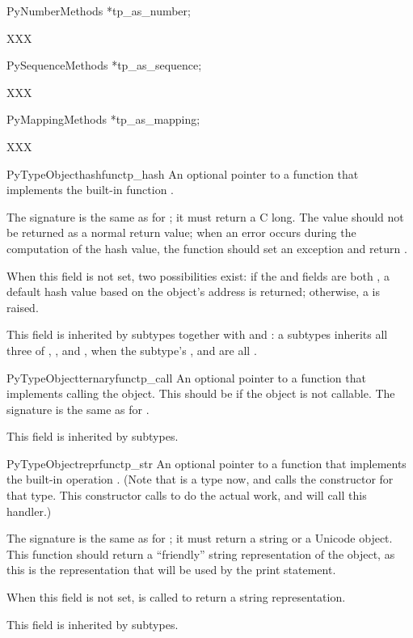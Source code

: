 PyNumberMethods *tp_as_number;

    XXX

PySequenceMethods *tp_as_sequence;

    XXX

PyMappingMethods *tp_as_mapping;

    XXX

\begin{cmemberdesc}{PyTypeObject}{hashfunc}{tp_hash}
  An optional pointer to a function that implements the built-in
  function .

  The signature is the same as for ; it
  must return a C long.  The value  should not be returned as
  a normal return value; when an error occurs during the computation
  of the hash value, the function should set an exception and return
  .

  When this field is not set, two possibilities exist: if the
   and  fields are both
  \NULL, a default hash value based on the object's address is
  returned; otherwise, a  is raised.

  This field is inherited by subtypes together with
   and : a subtypes inherits
  all three of , , and
  , when the subtype's ,
   and  are all \NULL.
\end{cmemberdesc}

\begin{cmemberdesc}{PyTypeObject}{ternaryfunc}{tp_call}
  An optional pointer to a function that implements calling the
  object.  This should be \NULL{} if the object is not callable.  The
  signature is the same as for .

  This field is inherited by subtypes.
\end{cmemberdesc}

\begin{cmemberdesc}{PyTypeObject}{reprfunc}{tp_str}
  An optional pointer to a function that implements the built-in
  operation .  (Note that  is a type now,
  and  calls the constructor for that type.  This
  constructor calls  to do the actual work,
  and  will call this handler.)

  The signature is the same as for ; it must
  return a string or a Unicode object.  This function should return a
  ``friendly'' string representation of the object, as this is the
  representation that will be used by the print statement.

  When this field is not set,  is called to
  return a string representation.

  This field is inherited by subtypes.
\end{cmemberdesc}

